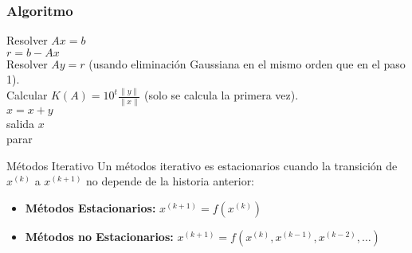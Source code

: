 \documentclass{beamer}
\begin{document}
  \begin{frame}    
    \frametitle{Algoritmo}
    \small
\begin{algorithm}[H]
 \caption{Algoritmo de Refinamiento Iterativo.}
 \BlankLine
 Resolver $Ax=b$\\
 {
  $r=b-Ax$\\
  Resolver $Ay=r$ (usando eliminaci\'on Gaussiana en el mismo orden que en el paso 1).\\
  Calcular $K(A) = 10^t\displaystyle\frac{\|y\|}{\|x\|}$ (solo se calcula la primera vez).\\
  $x=x+y$\\
  {
    salida $x$\\
    parar
  }
 }
\end{algorithm}
  \end{frame}
  \begin{frame}{M\'etodos Iterativo}
    Un m\'etodos iterativo es estacionarios cuando la transici\'on de $x^{(k)}$ a $x^{(k+1)}$ no depende de la historia anterior:
     \begin{itemize}
      \item \textbf{M\'etodos Estacionarios:} $x^{(k+1)} = f(x^{(k)})$
      \item \textbf{M\'etodos no Estacionarios:} $x^{(k+1)} = f(x^{(k)},x^{(k-1)},x^{(k-2)},\ldots)$
     \end{itemize}
    \end{frame}
\end{document}
